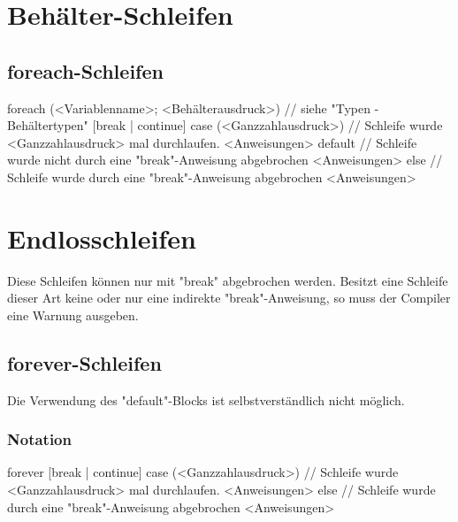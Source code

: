 \section{Behälter-Schleifen}

\subsection{foreach-Schleifen}
foreach (<Variablenname>; <Behälterausdruck>) // siehe "Typen - Behältertypen"
{
	[break | continue]
}
case (<Ganzzahlausdruck>) // Schleife wurde <Ganzzahlausdruck> mal durchlaufen.
	<Anweisungen>
default // Schleife wurde nicht durch eine "break"-Anweisung abgebrochen
	<Anweisungen>
else // Schleife wurde durch eine "break"-Anweisung abgebrochen
	<Anweisungen>

\section{Endlosschleifen}
Diese Schleifen können nur mit "break" abgebrochen werden. Besitzt eine Schleife dieser Art keine oder nur eine indirekte
"break"-Anweisung, so muss der Compiler eine Warnung ausgeben.

\subsection{forever-Schleifen}
Die Verwendung des "default"-Blocks ist selbstverständlich nicht möglich.

\subsubsection{Notation}
forever
	[break | continue]
case (<Ganzzahlausdruck>) // Schleife wurde <Ganzzahlausdruck> mal durchlaufen.
	<Anweisungen>
else // Schleife wurde durch eine "break"-Anweisung abgebrochen
	<Anweisungen>